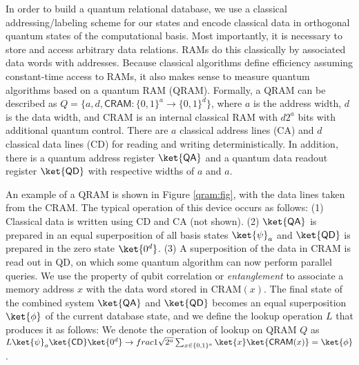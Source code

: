 \documentclass{toc}
\theoremstyle{plain}
\theoremstyle{definition}
\begin{document}
In order to build a quantum relational database, we use a
classical addressing/labeling scheme for our states and
encode classical data in orthogonal quantum states of the
computational basis.
Most importantly, it is necessary to
store and access arbitrary data relations. RAMs do this classically by
associated data words with addresses.
%
Because classical algorithms define efficiency assuming constant-time
access to RAMs, it also makes sense to measure quantum algorithms based
on a quantum RAM (QRAM).
Formally, a QRAM can be described as
$Q=\{a,d,\textsf{CRAM}:\{0,1\}^a\rightarrow\{0,1\}^d\}$,
where  $a$ is the address width,
$d$ is the data width, and \textsf{CRAM} is an internal classical
RAM with $d2^a$ bits with additional quantum control.
There are $a$ classical address lines
(\textsf{CA}) and $d$ classical data lines (\textsf{CD})
for reading and writing deterministically.
In addition, there is a quantum address register $\ket{\textsf{QA}}$
and a quantum data readout register $\ket{\textsf{QD}}$ with respective
widths of $a$ and $a$.

An example of a QRAM is shown in Figure \ref{qram:fig}, with the data lines
taken from the \textsf{CRAM}. The typical
operation of this device occurs as follows: (1) Classical data is written
using \textsf{CD} and \textsf{CA} (not shown). (2) $\ket{\textsf{QA}}$ is
prepared in an equal superposition of all basis states $\ket{\psi}_a$
and $\ket{\textsf{QD}}$ is
prepared in the zero state $\ket{0^d}$.
(3) A superposition of the data in \textsf{CRAM} is read out in
\textsf{QD}, on which some quantum algorithm can now perform parallel
queries. We use the property of qubit correlation or
\textit{entanglement} to associate a memory address $x$ with the data word
stored in \textsf{CRAM}$(x)$.
The final state of the combined system $\ket{\textsf{QA}}$ and
$\ket{\textsf{QD}}$ becomes an equal superposition $\ket{\phi}$
of the current
database state, and we define the lookup operation $L$ that produces it
as follows:
We denote the operation of lookup on QRAM $Q$ as
$L\ket{\psi}_a\ket{\textsf{CD}}\ket{0^d} \rightarrow
frac{1}{\sqrt{2^a}}\sum_{x \in \{0,1\}^a}\ket{x}\ket{\textsf{CRAM}(x)} = \ket{\phi}$.
\end{document}
